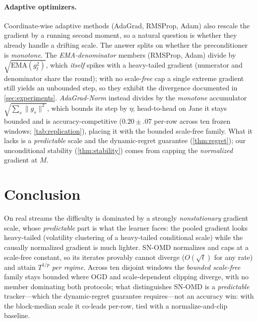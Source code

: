 \documentclass{article}
\newcommand{\norm}[1]{\lVert #1 \rVert}
\newcommand{\gt}{g_t}
\begin{document}
\paragraph{Adaptive optimizers.} Coordinate-wise adaptive methods (AdaGrad, RMSProp,
Adam) also rescale the gradient by a running second moment, so a natural question is
whether they already handle a drifting scale. The answer splits on whether the
preconditioner is \emph{monotone}. The \emph{EMA-denominator} members (RMSProp, Adam)
divide by $\sqrt{\mathrm{EMA}(\gt^2)}$, which \emph{itself} spikes with a heavy-tailed
gradient (numerator and denominator share the round); with no scale-\emph{free} cap a
single extreme gradient still yields an unbounded step, so they exhibit the divergence
documented in \cref{sec:experiments}. \emph{AdaGrad-Norm} instead divides by the
\emph{monotone} accumulator $\sqrt{\sum_s\norm{g_s}^2}$, which bounds its step by $\eta$;
head-to-head on Jane it stays bounded and is accuracy-competitive ($0.20\!\pm\!.07$ per-row
across ten frozen windows; \cref{tab:replication}), placing it with the
bounded scale-free family. What it lacks is a
\emph{predictable} scale and the dynamic-regret guarantee (\cref{thm:regret}); our
unconditional stability (\cref{thm:stability}) comes from capping the \emph{normalized}
gradient at $M$.

\section{Conclusion}
\label{sec:conclusion}

On real streams the difficulty is dominated by a strongly \emph{nonstationary} gradient
scale, whose \emph{predictable} part is what the learner faces: the pooled gradient looks
heavy-tailed (volatility clustering of a heavy-tailed conditional scale) while the causally
normalized gradient is much lighter. SN-OMD normalizes and caps at a scale-free constant, so its
iterates provably cannot diverge ($O(\sqrt t)$ for any rate) and attain $T^{1/p}$ \emph{per
regime}. Across ten disjoint windows the \emph{bounded scale-free} family stays bounded where
OGD and scale-dependent clipping diverge, with no member dominating both protocols; what
distinguishes SN-OMD is a \emph{predictable} tracker---which the dynamic-regret guarantee
requires---not an accuracy win: with the block-median scale it co-leads per-row, tied with a
normalize-and-clip baseline.
\end{document}
